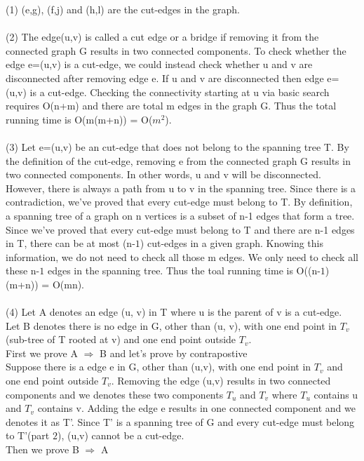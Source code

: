 \documentclass[11pt]{article}
\begin{document}
\begin{solution}(1) (e,g), (f,j) and (h,l) are the cut-edges in the graph. \\\\
(2) The edge(u,v) is called a cut edge or a bridge if removing it from the connected graph G results in two connected components. To check whether the edge e=(u,v) is a cut-edge, we could instead check whether u and v are disconnected after removing edge e. If u and v are disconnected then edge e=(u,v) is a cut-edge. Checking the connectivity starting at u via basic search requires O(n+m) and there are total m edges in the graph G. Thus the total running time is O(m(m+n)) = O($m^2$). \\\\
(3) Let e=(u,v) be an cut-edge that does not belong to the spanning tree T. By the definition of the cut-edge, removing e from the connected graph G results in two connected components. In other words, u and v will be disconnected. However, there is always a path from u to v in the spanning tree. Since there is a contradiction, we've proved that every cut-edge must belong to T. By definition, a spanning tree of a graph on n vertices is a subset of n-1 edges that form a tree. Since we've proved that every cut-edge must belong to T and there are n-1 edges in T, there can be at most (n-$1$) cut-edges in a given graph. Knowing this information, we do not need to check all those m edges. We only need to check all these n-$1$ edges in the spanning tree. Thus the toal running time is O((n-$1$)(m+n)) = O(mn). \\\\
(4) Let A denotes an edge (u, v) in T where u is the parent of v is a cut-edge. \\
Let B denotes there is no edge in G, other than (u, v), with one end point in $T_v$ (sub-tree of T rooted at v) and one end point outside $T_v$. \\
First we prove A $\Rightarrow$ B and let's prove by contrapostive \\
Suppose there is a edge e in G, other than (u,v), with one end point in $T_v$ and one end point outside $T_v$. Removing the edge (u,v) results in two connected components and we denotes these two components $T_u$ and $T_v$ where $T_u$ contains u and $T_v$ contains v. Adding the edge e results in one connected component and we denotes it as T'. Since T' is a spanning tree of G and every cut-edge must belong to T'(part $2$), (u,v) cannot be a cut-edge. \\
Then we prove B $\Rightarrow$ A \\

\end{solution}
\end{document}
